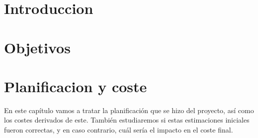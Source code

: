 \documentclass[a4paper,11pt, oneside]{book}
\begin{document}


%

%
%
%
%
%
%
%
%
%
%
%
%
%
%
%
%
%
%
%
%
%
%
\tableofcontents

\chapter{Introduccion}


\chapter{Objetivos}


\chapter{Planificacion y coste}


En este capítulo vamos a tratar la planificación que se hizo del proyecto, así como los costes derivados de este. También estudiaremos si estas estimaciones iniciales fueron correctas, y en caso contrario, cuál sería el impacto en el coste final.
\end{document}
